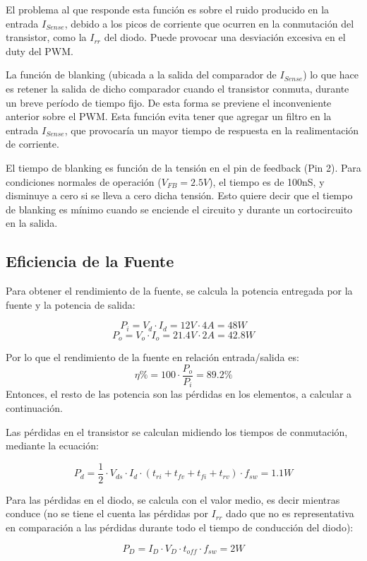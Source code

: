 \documentclass[e4_tp2_main.tex]{subfiles}
\begin{document}
El problema al que responde esta función es sobre el ruido producido en la entrada $I_{Sense}$, debido a los picos de corriente que ocurren en la conmutación del transistor, como la $I_{rr}$ del diodo. Puede provocar una desviación excesiva en el duty del PWM.\par
La función de blanking (ubicada a la salida del comparador de $I_{Sense}$) lo que hace es retener la salida de dicho comparador cuando el transistor conmuta, durante un breve período de tiempo fijo. De esta forma se previene el inconveniente anterior sobre el PWM. Esta función evita tener que agregar un filtro en la entrada $I_{Sense}$, que provocaría un mayor tiempo de respuesta en la realimentación de corriente.\par
El tiempo de blanking es función de la tensión en el pin de feedback (Pin 2). Para condiciones normales de operación ($V_{FB} = 2.5V$), el tiempo es de 100nS, y disminuye a cero si se lleva a cero dicha tensión. Esto quiere decir que el tiempo de blanking es mínimo cuando se enciende el circuito y durante un cortocircuito en la salida. 

\newpage

\subsection{Eficiencia de la Fuente}
Para obtener el rendimiento de la fuente, se calcula la potencia entregada por la fuente y la potencia de salida:

\[
P_i = V_d \cdot I_d = 12V \cdot 4A = 48W  
\]
\[
P_o = V_o \cdot I_o = 21.4V \cdot 2A = 42.8W
\]

Por lo que el rendimiento de la fuente en relación entrada/salida es:
\[
\eta \% = 100 \cdot \frac{P_o}{P_i} = 89.2 \%
\]
Entonces, el resto de las potencia son las pérdidas en los elementos, a calcular a continuación.\par

Las pérdidas en el transistor se calculan midiendo los tiempos de conmutación, mediante la ecuación:

\[
P_d = \frac{1}{2} \cdot V_{ds} \cdot I_d \cdot (t_{ri} + t_{fv} + t_{fi} + t_{rv}) \cdot f_{sw} = 1.1W
\]

Para las pérdidas en el diodo, se calcula con el valor medio, es decir mientras conduce (no se tiene el cuenta las pérdidas por $I_{rr}$ dado que no es representativa en comparación a las pérdidas durante todo el tiempo de conducción del diodo):

\[
P_D = I_D \cdot V_D \cdot t_{off} \cdot f_{sw} = 2W
\]
\end{document}
